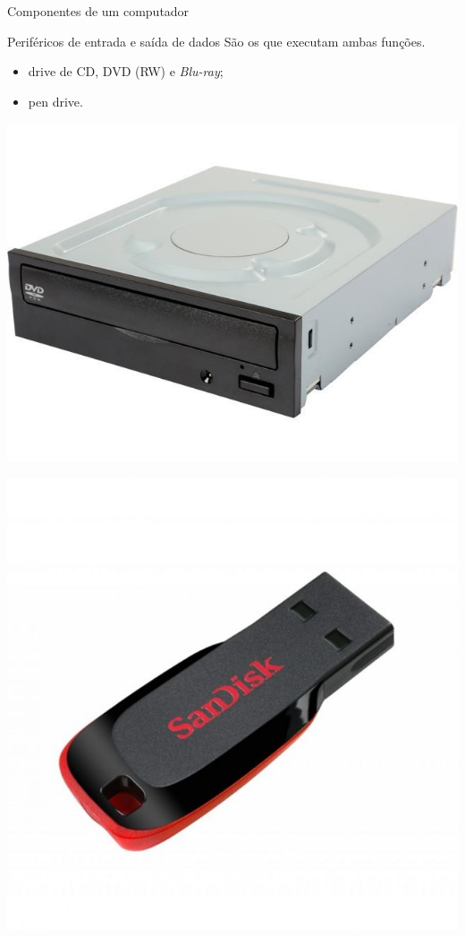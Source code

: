 \begin{frame}{Componentes de um computador}
	\begin{block}{Periféricos de entrada e saída de dados}
		São os que executam ambas funções.
		\begin{itemize}
			\item drive de CD, DVD (RW) e \textit{Blu-ray};
			\item pen drive.
		\end{itemize}
	\end{block}

	\begin{minipage}{0.49\linewidth}
		\centering
		\includegraphics[width=1\linewidth]{Figuras/Ch01/fig27.1}
	\end{minipage}\hfill
	\begin{minipage}{0.49\linewidth}
		\centering
		\includegraphics[width=1\linewidth]{Figuras/Ch01/fig27.2}
	\end{minipage}
\end{frame}


